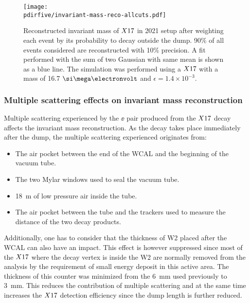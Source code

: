 \begin{figure}[tbh!]
  \centering
  \texttt{[image: \\pdirfive/invariant-mass-reco-allcuts.pdf]}
  \caption[Invariant mass reconstruction in 2021 setup]{Reconstructed invariant mass of $X17$ in 2021 setup after weighting each event by its probability to decay outside the dump. 90\% of all events considered are reconstructed with 10\% precision. A fit performed with the sum of two Gaussian with same mean is shown as a blue line. The simulation was performed using a $X17$ with a mass of 16.7 $\mev$ and $\epsilon = 1.4\times10^{-3}$.}
    \label{fig:imassreco}
  \end{figure}

\subsubsection{Multiple scattering effects on invariant mass reconstruction}
\label{ch5:sec:mm-scattering}

Multiple scattering experienced by the $\ee$ pair produced from the $X17$ decay affects the invariant mass reconstruction. As the decay takes place immediately after the dump, the multiple scattering experienced originates from:

\begin{itemize}
\item The air pocket between the end of the WCAL and the beginning of the vacuum tube.
\item The two Mylar windows used to seal the vacuum tube.
\item \SI{18}{\meter} of low pressure air inside the tube.
\item The air pocket between the tube and the trackers used to measure the distance of the two decay products.
\end{itemize}

Additionally, one has to consider that the thickness of W2 placed after the WCAL can also have an impact. This effect is however suppressed since most of the $X17$ where the decay vertex is inside the W2 are normally removed from the analysis by the requirement of small energy deposit in this active area. The thickness of this counter was minimized from the \SI{6}{\milli\meter} used previously to \SI{3}{\milli\meter}. This reduces the contribution of multiple scattering and at the same time increases the $X17$ detection efficiency since the dump length is further reduced.

